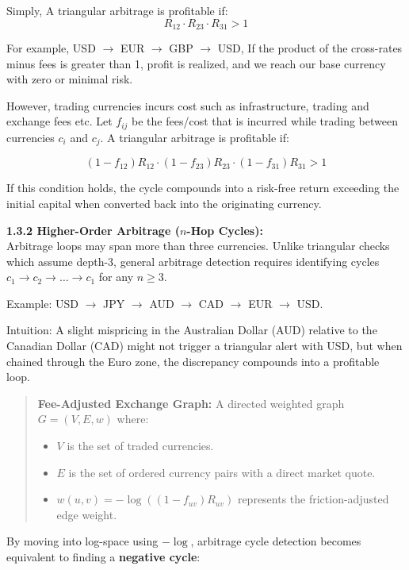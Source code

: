 \documentclass[letterpaper,11pt]{report}
\begin{document}
Simply, A triangular arbitrage is profitable if:
\[
R_{12} \cdot R_{23} \cdot R_{31} > 1
\]

For example, USD $\to$  EUR $\to$ GBP $\to$ USD,  If the product of the cross-rates minus fees is greater than 1, profit is realized, and we reach our base currency with zero or minimal risk.

However, trading currencies incurs cost such as infrastructure, trading and exchange fees etc. Let $f_{ij}$ be the fees/cost that is incurred while trading between currencies $c_i$ and $c_j$. A triangular arbitrage is profitable if:

\[
(1 - f_{12}) R_{12} \cdot (1 - f_{23}) R_{23} \cdot (1 - f_{31}) R_{31} > 1
\]

If this condition holds, the cycle compounds into a risk-free return exceeding the initial capital when converted back into the originating currency. 

\vspace{1em}

\textbf{1.3.2 Higher-Order Arbitrage ($n$-Hop Cycles):}  \\
Arbitrage loops may span more than three currencies. Unlike triangular checks which assume depth-3, 
general arbitrage detection requires identifying cycles $c_1 \to c_2 \to \dots \to c_1$ for any $n \geq 3$. 

Example: USD $\to$ JPY $\to$ AUD $\to$ CAD $\to$ EUR $\to$ USD.

Intuition: A slight mispricing in the Australian Dollar (AUD) relative to the Canadian Dollar (CAD) might not trigger a triangular alert with USD, but when chained through the Euro zone, the discrepancy compounds into a profitable loop.


\begin{quote}
    \textbf{Fee-Adjusted Exchange Graph:}  
    A directed weighted graph $G = (V, E, w)$ where:
    \begin{itemize}
        \item $V$ is the set of traded currencies.
        \item $E$ is the set of ordered currency pairs with a direct market quote.
        \item $w(u,v) = -\log((1 - f_{uv}) R_{uv})$ represents the friction-adjusted edge weight.
    \end{itemize}
\end{quote}

By moving into log-space using $-\log$, arbitrage cycle detection becomes equivalent to finding a \textbf{negative cycle}:
\end{document}
